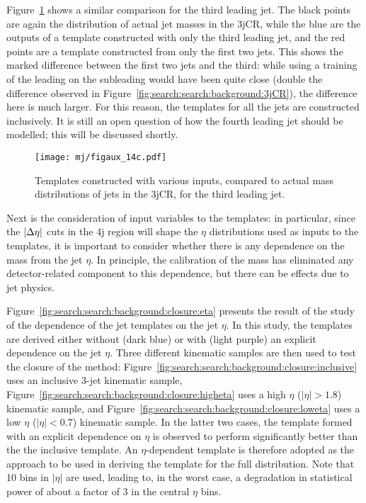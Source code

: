 Figure~\ref{fig:search:search:background:3jCRThird} shows a similar comparison for the third leading jet. The black points are again the distribution of actual jet masses in the 3jCR, while the blue are the outputs of a template constructed with only the third leading jet, and the red points are a template constructed from only the first two jets. This shows the marked difference between the first two jets and the third: while using a training of the leading on the subleading would have been quite close (double the difference observed in Figure~\ref{fig:search:search:background:3jCR}), the difference here is much larger. For this reason, the templates for all the jets are constructed inclusively. It is still an open question of how the fourth leading jet should be modelled; this will be discussed shortly.


\begin{figure}
\centering
\texttt{[image: mj/figaux\_14c.pdf]}
\label{fig:search:search:background:3jCRThird}
\caption{Templates constructed with various inputs, compared to actual mass distributions of jets in the 3jCR, for the third leading jet.}
\end{figure}


Next is the consideration of input variables to the templates: in particular, since the $|\Delta\eta|$ cuts in the 4j region will shape the $\eta$ distributions used as inputs to the templates, it is important to consider whether there is any dependence on the mass from the jet $\eta$. In principle, the calibration of the mass has eliminated any detector-related component to this dependence, but there can be effects due to jet physics.


Figure~\ref{fig:search:search:background:closure:eta} presents the result of the study of the dependence of the jet templates on the jet $\eta$. In this study, the templates are derived either without (dark blue) or with (light purple) an explicit dependence on the jet $\eta$. Three different kinematic samples are then used to test the closure of the method: Figure~\ref{fig:search:search:background:closure:inclusive} uses an inclusive 3-jet kinematic sample, Figure~\ref{fig:search:search:background:closure:higheta} uses a high $\eta$ ($|\eta|>1.8$) kinematic sample, and Figure~\ref{fig:search:search:background:closure:loweta} uses a low $\eta$ ($|\eta|<0.7$) kinematic sample. In the latter two cases, the template formed with an explicit dependence on $\eta$ is observed to perform significantly better than the the inclusive template. An $\eta$-dependent template is therefore adopted as the approach to be used in deriving the template for the full \MJ distribution. Note that 10 bins in $|\eta|$ are used, leading to, in the worst case, a degradation in statistical power of about a factor of 3 in the central $\eta$ bins.

